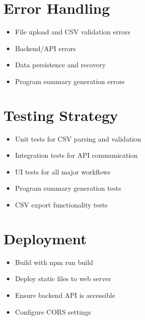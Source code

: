 \documentclass[12pt,a4paper]{article}
\begin{document}
\section{Error Handling}
\begin{itemize}
    \item File upload and CSV validation errors
    \item Backend/API errors
    \item Data persistence and recovery
    \item Program summary generation errors
\end{itemize}

\section{Testing Strategy}
\begin{itemize}
    \item Unit tests for CSV parsing and validation
    \item Integration tests for API communication
    \item UI tests for all major workflows
    \item Program summary generation tests
    \item CSV export functionality tests
\end{itemize}

\section{Deployment}
\begin{itemize}
    \item Build with npm run build
    \item Deploy static files to web server
    \item Ensure backend API is accessible
    \item Configure CORS settings
\end{itemize}
\end{document}
